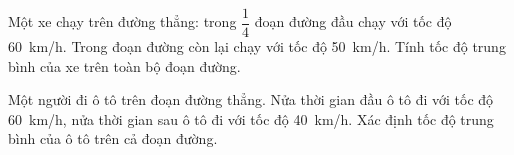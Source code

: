 \begin{vd}
	Một xe chạy trên đường thẳng: trong $\dfrac{1}{4}$ đoạn đường đầu chạy với tốc độ \SI{60}{\kilo\meter/\hour}. Trong đoạn đường còn lại chạy với tốc độ \SI{50}{\kilo\meter/\hour}. Tính tốc độ trung bình của xe trên toàn bộ đoạn đường.
\end{vd}
\begin{vd}
	Một người đi ô tô trên đoạn đường thẳng. Nửa thời gian đầu ô tô đi với tốc độ \SI{60}{\kilo\meter/\hour}, nửa thời gian sau ô tô đi với tốc độ \SI{40}{\kilo\meter/\hour}. Xác định tốc độ trung bình của ô tô trên cả đoạn đường.
\end{vd}

